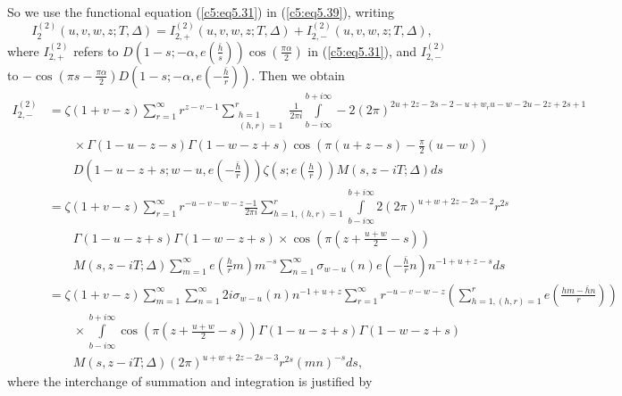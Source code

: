 So we use the functional equation (\ref{c5:eq5.31}) in
(\ref{c5:eq5.39}), writing  
\begin{equation}
I^{(2)}_2 (u,v,w,z;T,\Delta) = I^{(2)}_{2,+} (u,v,w,z;T,\Delta) +
I^{(2)}_{2,-} (u,v,w,z;T,\Delta),\label{c5:eq5.43} 
\end{equation}
where $I^{(2)}_{2,+}$ refers to $D \left(1-s;-\alpha, e
\left(\frac{\bar{h}}{s} \right) \right) \cos \left(\frac{\pi
  \alpha}{2} \right)$ in (\ref{c5:eq5.31}), and $I^{(2)}_{2,-}$ to
$-\cos \left(\pi s -\frac{\pi \alpha}{2} \right) D \left(1-s;-\alpha,
e \left(-\frac{\bar{h}}{r} \right) \right)$. Then we obtain 
{\fontsize{9}{11}\selectfont
\begin{align*}
I^{(2)}_{2,-}  & = \zeta (1+v-z) \sum\limits^\infty_{r=1} r^{z-v-1} \sum\limits^r_{\substack{h=1\\(h,r)=1}} \frac{1}{2\pi i} \int\limits^{b+ i \infty}_{b-i\infty} - 2(2\pi)^{2u + 2 z - 2s - 2 -u + w_r u - w - 2u - 2 z + 2 s +1}\\
&\qquad  \times  \Gamma (1-u-z-s) \Gamma(1-w-z+s) \cos \left(\pi (u+z-s) - \frac{\pi}{2}(u-w) \right) \\
& \qquad D \left(1-u - z + s ; w - u, e \left(-\frac{\bar{h}}{r} \right) \right)
 \zeta \left(s;e \left(\frac{h}{r} \right) \right) M(s, z - i T;\Delta) ds \\
& = \zeta (1+v-z) \sum\limits^\infty_{r=1}  r^{-u - v - w - z} \frac{-1}{2 \pi i} \sum\limits^r_{h=1, (h,r) = 1 } \int\limits^{b+ i \infty}_{b- i \infty}  2 (2 \pi)^{u+w+ 2 z - 2 s - 2} r^{2s}\\
& \qquad  \Gamma(1- u - z + s) \Gamma (1-w-z+s)
\times \cos \left(\pi \left(z+ \frac{u+w}{2} - s \right) \right)\\
& \qquad  M(s, z - i T; \Delta) \sum\limits^\infty_{m=1} e \left(\frac{h}{r} m \right) m^{-s} \sum\limits^\infty_{n=1} \sigma_{w-u} (n) e \left(-\frac{\bar{h}}{r}n \right) n^{-1 + u + z -s} ds \\
 & = \zeta(1+v-z) \sum\limits^\infty_{m=1} \sum\limits^\infty_{n=1} 2 i \sigma_{w - u} (n) n^{-1+ u+z} \sum\limits^\infty_{r=1} r^{-u-v-w-z} \left( \sum\limits^r_{h=1, (h,r) =1} e \left(\frac{hm - \bar{h}n}{r}\right)\right)\\
& \qquad \times \int\limits^{b+ i \infty}_{b- i \infty} \cos \left(\pi \left(z+ \frac{u+w}{2} - s \right) \right) \Gamma (1-u - z +s) \Gamma (1-w-z+s) \\
& \qquad  M (s, z - iT;\Delta) (2\pi)^{u+w+ 2z-2s -3} r^{2s} (mn)^{-s} ds,
\end{align*}}
where the interchange of summation and integration is justified by
